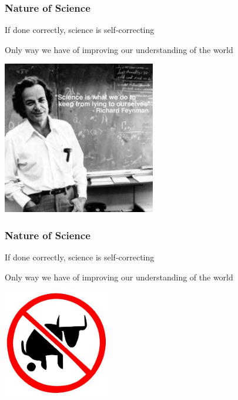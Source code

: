 \documentclass[10pt]{beamer}
\begin{document}
\begin{frame}[t]
\frametitle{Nature of Science}
\vspace{0.5cm}

	If done correctly, science is self-correcting\\
	
	\vspace{0.5cm}
	
	Only way we have of improving our understanding of the world\\
	
	\vspace{0.5cm}
	
	\begin{center}
		\includegraphics[width=0.5\textwidth]{figures/feynman.jpg}
	\end{center}
\end{frame}


\begin{frame}[t]
\frametitle{Nature of Science}
\vspace{0.5cm}

	If done correctly, science is self-correcting\\
	
	\vspace{0.5cm}
	
	Only way we have of improving our understanding of the world\\
	
	\vspace{0.5cm}
	
	\begin{center}
		\includegraphics[width=0.35\textwidth]{figures/bullshit.jpg}
	\end{center}
\end{frame}
\end{document}
